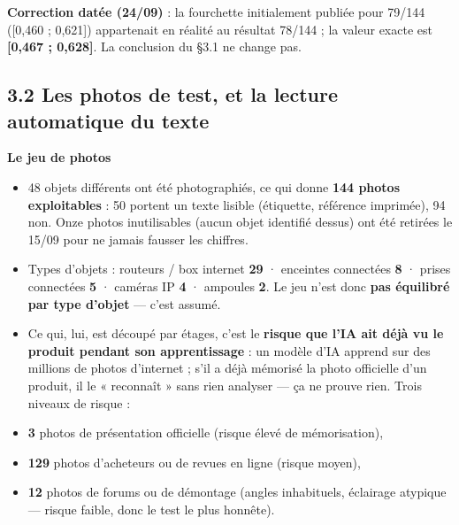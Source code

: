 \documentclass[11pt,a4paper]{article}
\begin{document}
\textbf{Correction datée (24/09)} : la fourchette initialement publiée pour 79/144 ([0,460 ; 0,621]) appartenait en réalité au résultat 78/144 ; la valeur exacte est \textbf{[0,467 ; 0,628]}. La conclusion du §3.1 ne change pas.

\subsection*{3.2 Les photos de test, et la lecture automatique du texte}
\textbf{Le jeu de photos}

\begin{itemize}  \item 48 objets différents ont été photographiés, ce qui donne \textbf{144 photos exploitables} : 50 portent un texte lisible (étiquette, référence imprimée), 94 non. Onze photos inutilisables (aucun objet identifié dessus) ont été retirées le 15/09 pour ne jamais fausser les chiffres.
\end{itemize}

\begin{itemize}  \item Types d'objets : routeurs / box internet \textbf{29} · enceintes connectées \textbf{8} · prises connectées \textbf{5} · caméras IP \textbf{4} · ampoules \textbf{2}. Le jeu n'est donc \textbf{pas équilibré par type d'objet} — c'est assumé.
\end{itemize}

\begin{itemize}  \item Ce qui, lui, est découpé par étages, c'est le \textbf{risque que l'IA ait déjà vu le produit pendant son apprentissage} : un modèle d'IA apprend sur des millions de photos d'internet ; s'il a déjà mémorisé la photo officielle d'un produit, il le « reconnaît » sans rien analyser — ça ne prouve rien. Trois niveaux de risque :
\end{itemize}

\begin{itemize}  \item \textbf{3} photos de présentation officielle (risque élevé de mémorisation),
\end{itemize}

\begin{itemize}  \item \textbf{129} photos d'acheteurs ou de revues en ligne (risque moyen),
\end{itemize}

\begin{itemize}  \item \textbf{12} photos de forums ou de démontage (angles inhabituels, éclairage atypique — risque faible, donc le test le plus honnête).
\end{itemize}
\end{document}
